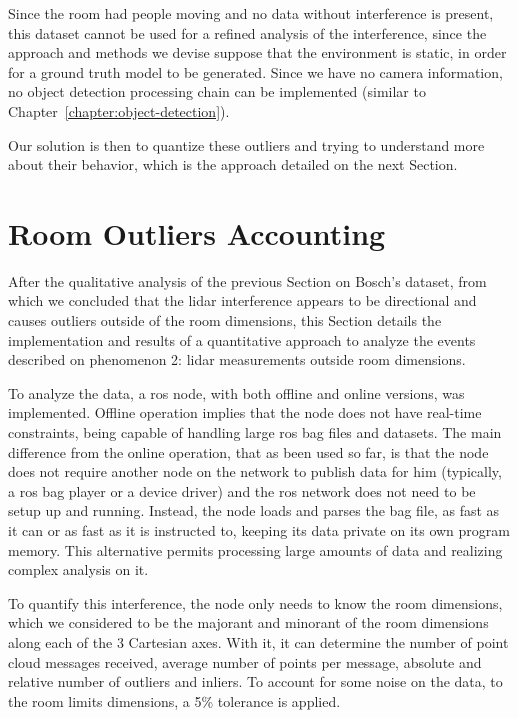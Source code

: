 Since the room had people moving and no data without interference is present, this dataset cannot be used for a refined analysis of the interference, since the approach and methods we devise suppose that the environment is static, in order for a ground truth model to be generated. Since we have no camera information, no object detection processing chain can be implemented (similar to Chapter~\ref{chapter:object-detection}). 

Our solution is then to quantize these outliers and trying to understand more about their behavior, which is the approach detailed on the next Section.




\section{Room Outliers Accounting}
\label{sec:lidar-interference:room-outliers}
After the qualitative analysis of the previous Section on Bosch's dataset, from which we concluded that the \ac{lidar} interference appears to be directional and causes outliers outside of the room dimensions, this Section details the implementation and results of a quantitative approach to analyze the events described on phenomenon 2: \ac{lidar} measurements outside room dimensions.

To analyze the data, a \ac{ros} node, with both offline and online versions, was implemented. Offline operation implies that the node does not have real-time constraints, being capable of handling large \ac{ros} bag files and datasets. The main difference from the online operation, that as been used so far, is that the node does not require another node on the network to publish data for him (typically, a \ac{ros} bag player or a device driver) and the \ac{ros} network does not need to be setup up and running. Instead, the node loads and parses the bag file, as fast as it can or as fast as it is instructed to, keeping its data private on its own program memory. This alternative permits processing large amounts of data and realizing complex analysis on it.

To quantify this interference, the node only needs to know the room dimensions, which we considered to be the majorant and minorant of the room dimensions along each of the 3 Cartesian axes. With it, it can determine the number of point cloud messages received, average number of points per message, absolute and relative number of outliers and inliers. To account for some noise on the data, to the room limits dimensions, a 5\% tolerance is applied. 

